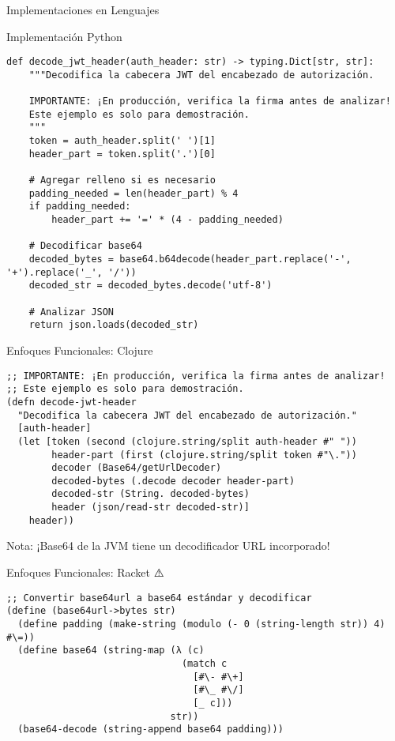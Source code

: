 \documentclass[presentation,aspectratio=169]{beamer}
\begin{document}
\begin{frame}[label={sec:orga7e0c44},fragile]{Implementaciones en Lenguajes}
\begin{block}{Implementación Python 🧩}
\begin{verbatim}
def decode_jwt_header(auth_header: str) -> typing.Dict[str, str]:
    """Decodifica la cabecera JWT del encabezado de autorización.

    IMPORTANTE: ¡En producción, verifica la firma antes de analizar!
    Este ejemplo es solo para demostración.
    """
    token = auth_header.split(' ')[1]
    header_part = token.split('.')[0]

    # Agregar relleno si es necesario
    padding_needed = len(header_part) % 4
    if padding_needed:
        header_part += '=' * (4 - padding_needed)

    # Decodificar base64
    decoded_bytes = base64.b64decode(header_part.replace('-', '+').replace('_', '/'))
    decoded_str = decoded_bytes.decode('utf-8')

    # Analizar JSON
    return json.loads(decoded_str)
\end{verbatim}
\end{block}
\begin{block}{Enfoques Funcionales: Clojure 🧩}
\begin{verbatim}
;; IMPORTANTE: ¡En producción, verifica la firma antes de analizar!
;; Este ejemplo es solo para demostración.
(defn decode-jwt-header 
  "Decodifica la cabecera JWT del encabezado de autorización."
  [auth-header]
  (let [token (second (clojure.string/split auth-header #" "))
        header-part (first (clojure.string/split token #"\."))
        decoder (Base64/getUrlDecoder)
        decoded-bytes (.decode decoder header-part)
        decoded-str (String. decoded-bytes)
        header (json/read-str decoded-str)]
    header))
\end{verbatim}

\alert{Nota}: ¡Base64 de la JVM tiene un decodificador URL incorporado!
\end{block}
\begin{block}{Enfoques Funcionales: Racket ⚠️}
\begin{verbatim}
;; Convertir base64url a base64 estándar y decodificar
(define (base64url->bytes str)
  (define padding (make-string (modulo (- 0 (string-length str)) 4) #\=))
  (define base64 (string-map (λ (c)
                               (match c
                                 [#\- #\+]
                                 [#\_ #\/]
                                 [_ c]))
                             str))
  (base64-decode (string-append base64 padding)))


\end{verbatim}
\end{block}
\end{frame}
\end{document}
